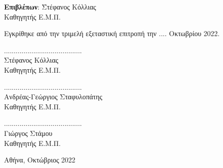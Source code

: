 \begin{titlepage}
\begin{center}
        \vspace{1.0cm}
        \Large
        \begin{flushleft}
        \begin{tabbing}
            
            \textbf{Επιβλέπων}: \= Στέφανος Κόλλιας \\
                                \> Καθηγητής Ε.Μ.Π.
        \end{tabbing}
        \end{flushleft}
        \vspace{0.5cm}
        Εγκρίθηκε από την τριμελή εξεταστική επιτροπή την .... Οκτωβρίου 2022.
        \vspace{1cm}

        \large
        \parbox[t]{0.3\textwidth} {
            \center
            ........................................ \\
            Στέφανος Κόλλιας \\
            Καθηγητής Ε.Μ.Π.
        }
        \parbox[t]{0.3\textwidth} {
            \center
            ........................................ \\
            Ανδρέας-Γεώργιος Σταφυλοπάτης  \\
            Καθηγητής Ε.Μ.Π.
        }
        \parbox[t]{0.3\textwidth} {
            \center
            ........................................ \\
            Γιώργος Στάμου  \\
            Καθηγητής Ε.Μ.Π.
        }


            
        \vspace{1.5cm}
            

        \Large

        Αθήνα, Οκτώβριος 2022
            
    \end{center}
\end{titlepage}
